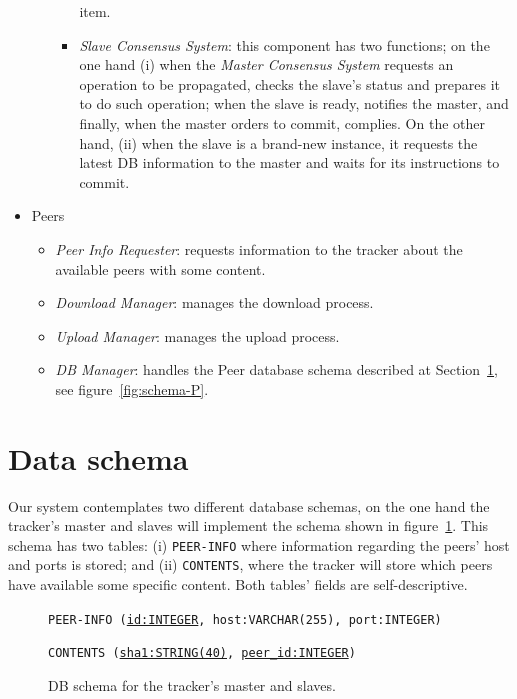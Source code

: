 \documentclass[twoside,a4paper,10pt]{article}
\begin{document}
\begin{itemize}
\begin{itemize}
\begin{itemize}
      item.
    \item \emph{Slave Consensus System}: this component has two functions; on
      the one hand
      (i) when the \emph{Master Consensus System} requests an operation to be
      propagated, checks the slave's status and prepares it to do such
      operation; when the slave is ready, notifies the master, and finally, when
      the master orders to commit, complies. On the other hand, (ii) when the
      slave is a brand-new instance, it requests the latest DB information to
      the master and waits for its instructions to commit.
    \end{itemize}
  \end{itemize}
\item Peers
  \begin{itemize}
  \item \emph{Peer Info Requester}: requests information to the tracker about
    the available peers with some content.
  \item \emph{Download Manager}: manages the download process.
  \item \emph{Upload Manager}: manages the upload process.
  \item \emph{DB Manager}: handles the Peer database schema described at
    Section~\ref{sec:data-schema}, see figure~\ref{fig:schema-P}.
  \end{itemize}
\end{itemize}


\section{Data schema}\label{sec:data-schema}

Our system contemplates two different database schemas, on the one hand the
tracker's master and slaves will implement the schema shown in
figure~\ref{fig:schema-MS}. This schema has two tables: (i) \texttt{PEER-INFO}
where information regarding the peers' host and ports is stored; and (ii)
\texttt{CONTENTS}, where the tracker will store which peers have available some
specific content. Both tables' fields are self-descriptive.

\begin{figure}[h]
  \centering
  \texttt{PEER-INFO (\underline{id:INTEGER}, host:VARCHAR(255), port:INTEGER)}
  
  \texttt{CONTENTS (\underline{sha1:STRING(40)}, \underline{peer\_id:INTEGER})}
  
  \centering
  \caption{\label{fig:schema-MS}DB schema for the tracker's master and slaves.}
\end{figure}
\end{document}
